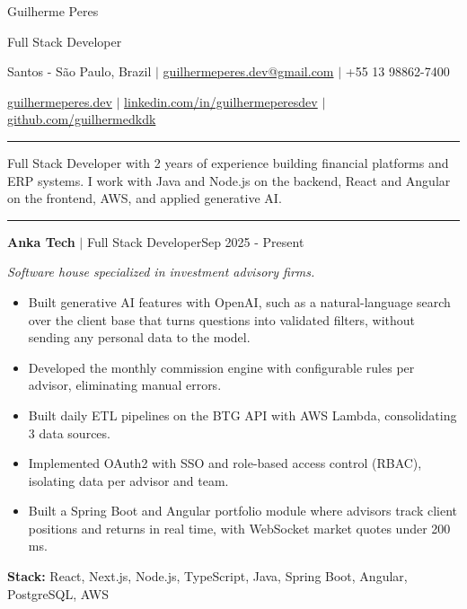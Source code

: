 \documentclass[letterpaper,10pt]{article}
\newcommand{\cvsection}[1]{%
  \vspace{9pt}{\large\bfseries #1}\par\vspace{-5pt}%
  \rule{\linewidth}{0.4pt}\par\vspace{1pt}}
\newcommand{\cvheading}[3]{\textbf{#1} $|$ #2\hfill #3\par}
\newenvironment{cvitems}
  {\begin{itemize}[leftmargin=0.16in,label={},itemsep=1.5pt,topsep=2pt,parsep=0pt]}
  {\end{itemize}}
\newcommand{\cvstack}[2]{\vspace{2pt}\textbf{#1:} #2\par}
\begin{document}
\begin{center}
  {\fontsize{25}{29}\selectfont Guilherme Peres}\par\vspace{3pt}
  {\large Full Stack Developer}\par\vspace{5pt}
  Santos - São Paulo, Brazil $|$
  \href{mailto:guilhermeperes.dev@gmail.com}{guilhermeperes.dev@gmail.com} $|$
  +55 13 98862-7400\par\vspace{2pt}
  {\small\color{black!60}%
  \href{https://guilhermeperes.dev/en}{guilhermeperes.dev} $|$
  \href{https://linkedin.com/in/guilhermeperesdev}{linkedin.com/in/guilhermeperesdev} $|$
  \href{https://github.com/guilhermedkdk}{github.com/guilhermedkdk}}
\end{center}

\cvsection{Profile}
Full Stack Developer with 2 years of experience building financial platforms and ERP systems.
I work with Java and Node.js on the backend, React and Angular on the frontend, AWS, and applied
generative AI.

\cvsection{Professional Experience}
\cvheading{Anka Tech}{Full Stack Developer}{Sep 2025 - Present}
\textit{Software house specialized in investment advisory firms.}\par
\begin{cvitems}
  \item Built generative AI features with OpenAI, such as a natural-language search over the
        client base that turns questions into validated filters, without sending any personal
        data to the model.
  \item Developed the monthly commission engine with configurable rules per advisor, eliminating
        manual errors.
  \item Built daily ETL pipelines on the BTG API with AWS Lambda, consolidating 3 data sources.
  \item Implemented OAuth2 with SSO and role-based access control (RBAC), isolating data per
        advisor and team.
  \item Built a Spring Boot and Angular portfolio module where advisors track client positions
        and returns in real time, with WebSocket market quotes under 200 ms.
\end{cvitems}
\cvstack{Stack}{React, Next.js, Node.js, TypeScript, Java, Spring Boot, Angular, PostgreSQL, AWS}
\end{document}

